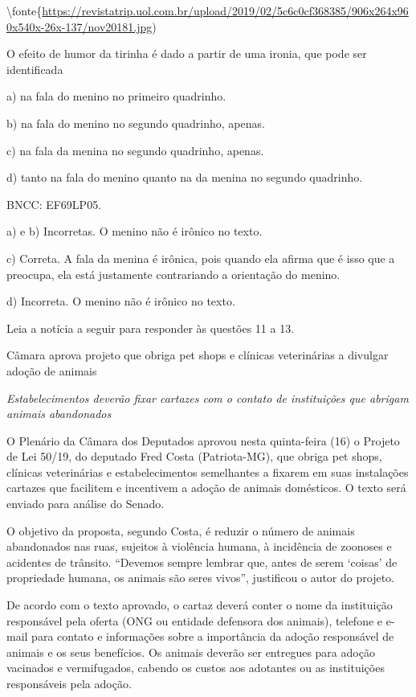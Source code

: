 \textbackslash fonte\{\url{https://revistatrip.uol.com.br/upload/2019/02/5c6c0cf368385/906x264x960x540x-26x-137/nov20181.jpg})

O efeito de humor da tirinha é dado a partir de uma ironia, que pode ser
identificada

a) na fala do menino no primeiro quadrinho.

b) na fala do menino no segundo quadrinho, apenas.

c) na fala da menina no segundo quadrinho, apenas.

d) tanto na fala do menino quanto na da menina no segundo quadrinho.

BNCC: EF69LP05.

a) e b) Incorretas. O menino não é irônico no texto.

c) Correta. A fala da menina é irônica, pois quando ela afirma que é
isso que a preocupa, ela está justamente contrariando a orientação do
menino.

d) Incorreta. O menino não é irônico no texto.

Leia a notícia a seguir para responder às questões 11 a 13.

Câmara aprova projeto que obriga pet shops e clínicas veterinárias a
divulgar adoção de animais

\emph{Estabelecimentos deverão fixar cartazes com o contato de
instituições que abrigam animais abandonados}

O Plenário da Câmara dos Deputados aprovou nesta quinta-feira (16) o
Projeto de Lei 50/19, do deputado Fred Costa (Patriota-MG), que obriga
pet shops, clínicas veterinárias e estabelecimentos semelhantes a
fixarem em suas instalações cartazes que facilitem e incentivem a adoção
de animais domésticos. O texto será enviado para análise do Senado.

O objetivo da proposta, segundo Costa, é reduzir o número de animais
abandonados nas ruas, sujeitos à violência humana, à incidência de
zoonoses e acidentes de trânsito. ``Devemos sempre lembrar que, antes de
serem `coisas' de propriedade humana, os animais são seres vivos'',
justificou o autor do projeto.

De acordo com o texto aprovado, o cartaz deverá conter o nome da
instituição responsável pela oferta (ONG ou entidade defensora dos
animais), telefone e e-mail para contato e informações sobre a
importância da adoção responsável de animais e os seus benefícios. Os
animais deverão ser entregues para adoção vacinados e vermifugados,
cabendo os custos aos adotantes ou as instituições responsáveis pela
adoção.

